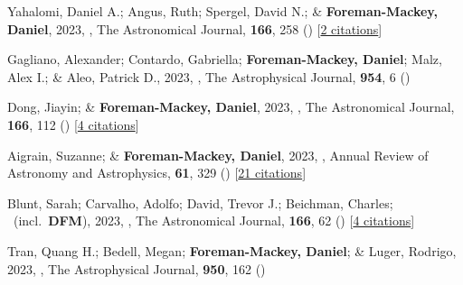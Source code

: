 \item[{\color{numcolor}\scriptsize100}] Yahalomi, Daniel A.; Angus, Ruth; Spergel, David N.; \& \textbf{Foreman-Mackey, Daniel}, 2023, , The Astronomical Journal, \textbf{166}, 258 () [\href{https://ui.adsabs.harvard.edu/abs/2023AJ....166..258Y}{2 citations}]

\item[{\color{numcolor}\scriptsize99}] Gagliano, Alexander; Contardo, Gabriella; \textbf{Foreman-Mackey, Daniel}; Malz, Alex I.; \& Aleo, Patrick D., 2023, , The Astrophysical Journal, \textbf{954}, 6 ()

\item[{\color{numcolor}\scriptsize98}] Dong, Jiayin; \& \textbf{Foreman-Mackey, Daniel}, 2023, , The Astronomical Journal, \textbf{166}, 112 () [\href{https://ui.adsabs.harvard.edu/abs/2023AJ....166..112D}{4 citations}]

\item[{\color{numcolor}\scriptsize97}] Aigrain, Suzanne; \& \textbf{Foreman-Mackey, Daniel}, 2023, , Annual Review of Astronomy and Astrophysics, \textbf{61}, 329 () [\href{https://ui.adsabs.harvard.edu/abs/2023ARA&A..61..329A}{21 citations}]

\item[{\color{numcolor}\scriptsize96}] Blunt, Sarah; Carvalho, Adolfo; David, Trevor J.; Beichman, Charles; \etal\ (incl.\ \textbf{DFM}), 2023, , The Astronomical Journal, \textbf{166}, 62 () [\href{https://ui.adsabs.harvard.edu/abs/2023AJ....166...62B}{4 citations}]

\item[{\color{numcolor}\scriptsize95}] Tran, Quang H.; Bedell, Megan; \textbf{Foreman-Mackey, Daniel}; \& Luger, Rodrigo, 2023, , The Astrophysical Journal, \textbf{950}, 162 ()

